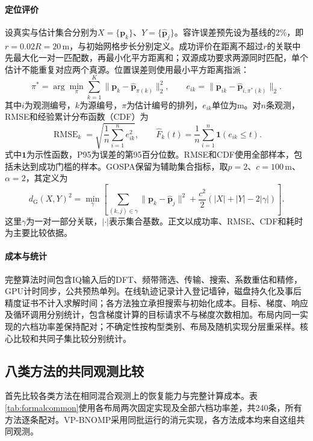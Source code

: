 \documentclass[a4paper,fleqn]{cas-sc}
\numberwithin{equation}{section}
\numberwithin{figure}{section}
\numberwithin{table}{section}
\begin{document}
\par

\FloatBarrier
\paragraph{定位评价}
设真实与估计集合分别为$X=\{\bm p_k\}$、$Y=\{\widehat{\bm p}_j\}$。容许误差预先设为基线的2\%，即$r=0.02R=20$\,m，与初始网格步长分别定义。成功评价在距离不超过$r$的关联中先最大化一对一匹配数，再最小化平方距离和；双源成功要求两源同时匹配，单个估计不能重复对应两个真源。位置误差则使用最小平方距离指派\cite{Kuhn1955}：
\begin{equation}
 \pi^*=\arg\min_{\pi}\sum_{k=1}^{K}\|\bm p_k-\widehat{\bm p}_{\pi(k)}\|_2^2,
 \qquad e_{ik}=\|\bm p_{ik}-\widehat{\bm p}_{i,\pi^*(k)}\|_2 .\label{eq:assignment}
\end{equation}
其中$i$为观测编号，$k$为源编号，$\pi$为估计编号的排列，$e_{ik}$单位为m。对$n$条观测，RMSE和经验累计分布函数（CDF）为
\begin{equation}
 \operatorname{RMSE}_k=\sqrt{\frac1n\sum_{i=1}^{n}e_{ik}^2},\qquad
 \widehat F_k(t)=\frac1n\sum_{i=1}^{n}\mathbf 1(e_{ik}\le t).\label{eq:rmseCDF}
\end{equation}
式中$\mathbf 1$为示性函数，P95为误差的第95百分位数。RMSE和CDF使用全部样本，包括未达到成功门槛的样本。GOSPA\cite{Rahmathullah2017}保留为辅助集合指标，取$p=2$、$c=100$\,m、$\alpha=2$，其定义为
\begin{equation}
 d_{\mathrm G}(X,Y)^2=\min_{\gamma}\left[
 \sum_{(k,j)\in\gamma}\|\bm p_k-\widehat{\bm p}_j\|^2
 +\frac{c^2}{2}\left(|X|+|Y|-2|\gamma|\right)\right].\label{eq:gospa}
\end{equation}
这里$\gamma$为一对一部分关联，$|\cdot|$表示集合基数。正文以成功率、RMSE、CDF和耗时为主要比较依据。

\paragraph{成本与统计}
完整算法时间包含IQ输入后的DFT、频带筛选、传输、搜索、系数重估和精修，GPU计时同步，公共预热单列。在线轨迹记录计入登记墙钟，磁盘持久化及事后精度证书不计入求解时间；各方法独立承担搜索与初始化成本。目标、梯度、响应及循环调用分别统计，包含梯度计算的目标请求不与梯度次数相加。布局内同一实现的六档功率差保持配对；不确定性按构型类别、布局及随机实现分层重采样。核心比较和共同子集比较分别统计。

\subsection{八类方法的共同观测比较}\label{sec:commonformal}
首先比较各类方法在相同混合观测上的恢复能力与完整计算成本。表\ref{tab:formalcommon}使用各布局两次固定实现及全部六档功率差，共240条，所有方法逐条配对。VP-BNOMP采用同批运行的消元实现，各方法成本均来自这组共同观测。
\end{document}
